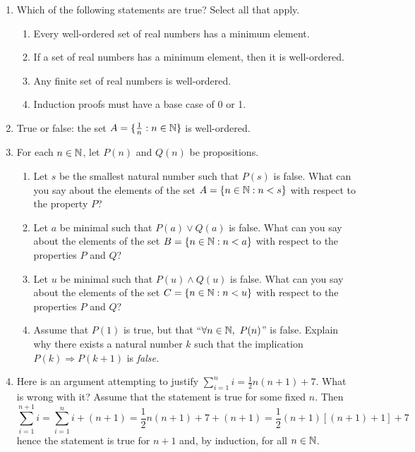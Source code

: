 \pagestyle{empty}


\begin{enumerate}
	\item Which of the following statements are true? Select all that apply.
	\begin{enumerate}
    \item Every well-ordered set of real numbers has a minimum element.
    \item If a set of real numbers has a minimum element, then it is well-ordered.
    \item Any finite set of real numbers is well-ordered.
    \item Induction proofs must have a base case of 0 or 1.
	\end{enumerate}
	
	
	\item True or false: the set $A=\{\frac 1n:n\in\mathbb{N}\}$ is well-ordered.
	
	
		
	\item For each $n\in\mathbb{N}$, let $P(n)$ and $Q(n)$ be propositions.
	\begin{enumerate}
		\item Let $s$ be the smallest natural number such that $P(s)$ is false. What can you say about the elements of the set $A=\{n\in\mathbb{N}:n<s\}$ with respect to the property $P$?
		\item Let $a$ be minimal such that $P(a)\vee Q(a)$ is false. What can you say about the elements of the set $B=\{n\in\mathbb{N}:n<a\}$ with respect to the properties $P$ and $Q$?
		\item Let $u$ be minimal such that $P(u)\wedge Q(u)$ is false. What can you say about the elements of the set $C=\{n\in\mathbb{N}:n<u\}$ with respect to the properties $P$ and $Q$?
		\item Assume that $P(1)$ is true, but that ``$\forall n\in\N,\ P(n)$'' is false. Explain why there exists a natural number $k$ such that the implication $P(k)\Longrightarrow P(k+1)$ is \emph{false.}
	\end{enumerate}
	
	
	\item Here is an argument attempting to justify $\sum\limits_{i=1}^ni=\frac 12n(n+1)+7$. What is wrong with it?\smallbreak
	Assume that the statement is true for some fixed $n$. Then
	\[
		\sum_{i=1}^{n+1}i=\sum_{i=1}^ni+(n+1)=\frac 12n(n+1)+7+(n+1)=\frac 12(n+1)[(n+1)+1]+7
	\]
	hence the statement is true for $n+1$ and, by induction, for all $n\in\mathbb{N}$.


\end{enumerate}
